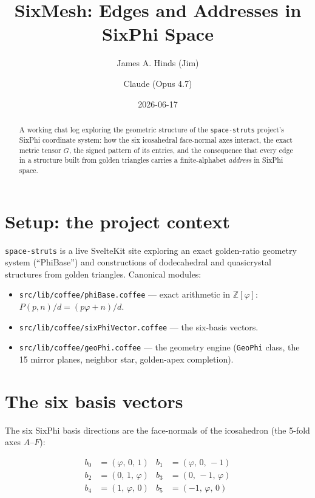 \documentclass[11pt]{article}
\title{SixMesh: Edges and Addresses in SixPhi Space}
\author{James A. Hinds (Jim) \and Claude (Opus 4.7)}
\date{2026-06-17}
\newcommand{\phigold}{\varphi}
\newcommand{\Zphi}{\mathbb{Z}[\phigold]}
\begin{document}
\maketitle

\begin{abstract}
A working chat log exploring the geometric structure of the
\texttt{space-struts} project's SixPhi coordinate system: how the six
icosahedral face-normal axes interact, the exact metric tensor \(G\), the
signed pattern of its entries, and the consequence that every edge in a
structure built from golden triangles carries a finite-alphabet
\emph{address} in SixPhi space.
\end{abstract}

\section{Setup: the project context}

\texttt{space-struts} is a live SvelteKit site exploring an exact
golden-ratio geometry system (``PhiBase'') and constructions of dodecahedral
and quasicrystal structures from golden triangles. Canonical modules:

\begin{itemize}
  \item \texttt{src/lib/coffee/phiBase.coffee} --- exact arithmetic in
        \(\Zphi\): \(P(p,n)/d = (p\phigold + n)/d\).
  \item \texttt{src/lib/coffee/sixPhiVector.coffee} --- the six-basis vectors.
  \item \texttt{src/lib/coffee/geoPhi.coffee} --- the geometry engine
        (\texttt{GeoPhi} class, the 15 mirror planes, neighbor star,
        golden-apex completion).
\end{itemize}

\section{The six basis vectors}

The six SixPhi basis directions are the face-normals of the icosahedron
(the 5-fold axes \(A\)--\(F\)):

\[
\begin{aligned}
b_0 &= (\phigold,\,0,\,1)   & b_1 &= (\phigold,\,0,\,-1) \\
b_2 &= (0,\,1,\,\phigold)   & b_3 &= (0,\,-1,\,\phigold) \\
b_4 &= (1,\,\phigold,\,0)   & b_5 &= (-1,\,\phigold,\,0)
\end{aligned}
\]
\end{document}
